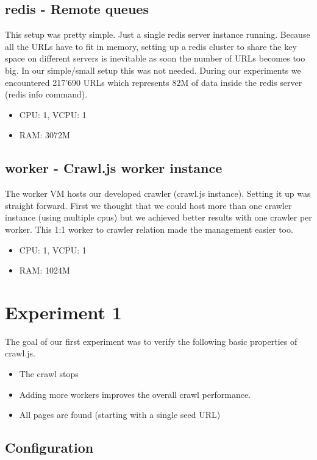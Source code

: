 \subsection{redis - Remote queues}
This setup was pretty simple. Just a single redis server instance running. Because all the URLs have to fit in memory, setting up a redis cluster to share the key space on different servers is inevitable as soon the number of URLs becomes too big. In our simple/small setup this was not needed. During our experiments we encountered 217'690 URLs which represents 82M of data inside the redis server (redis info command).

\begin{itemize}
  \item CPU: 1, VCPU: 1
  \item RAM: 3072M
\end{itemize}

\subsection{worker - Crawl.js worker instance}
The worker VM hosts our developed crawler (crawl.js instance). Setting it up was straight forward. First we thought that we could host more than one crawler instance (using multiple cpus) but we achieved better results with one crawler per worker. This 1:1 worker to crawler relation made the management easier too.

\begin{itemize}
  \item CPU: 1, VCPU: 1
  \item RAM: 1024M
\end{itemize}

\section{Experiment 1}

The goal of our first experiment was to verify the following basic properties of crawl.js.

\begin{itemize}
  \item The crawl stops
  \item Adding more workers improves the overall crawl performance.
  \item All pages are found (starting with a single seed URL)
\end{itemize}

\subsection{Configuration}

